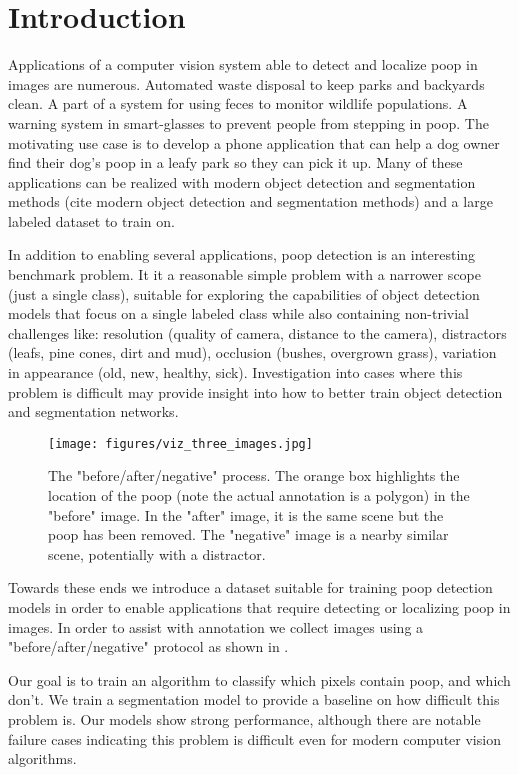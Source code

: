\documentclass[10pt,twocolumn,letterpaper]{article}
\begin{document}
\section{Introduction}
\label{sec:intro}

Applications of a computer vision system able to detect and localize poop in
images are numerous.
Automated waste disposal to keep parks and backyards clean.
A part of a system for using feces to monitor wildlife populations.
A warning system in smart-glasses to prevent people from stepping in poop.
The motivating use case is to develop a phone application that can help a dog
owner find their dog's poop in a leafy park so they can pick it up.
Many of these applications can be realized with modern object detection and
segmentation methods (cite modern object detection and segmentation methods)
and a large labeled dataset to train on.


In addition to enabling several applications, poop detection is an interesting benchmark problem. 
It it a reasonable simple problem with a narrower scope (just a single class),
suitable for exploring the capabilities of object detection models that focus
on a single labeled class while also containing non-trivial challenges like:
resolution (quality of camera, distance to the camera),
distractors (leafs, pine cones, dirt and mud),
occlusion (bushes, overgrown grass),
variation in appearance (old, new, healthy, sick).
Investigation into cases where this problem is difficult may provide insight
into how to better train object detection and segmentation networks.


\begin{figure}[h]
\centering
\texttt{[image: figures/viz\_three\_images.jpg]}
\caption[]{
    The "before/after/negative" process.
    The orange box highlights the location of the poop (note the
    actual annotation is a polygon) in the "before" image.
    In the "after" image, it is the same scene but the poop has been removed.
    The "negative" image is a nearby similar scene, potentially with a distractor.
}
\label{fig:ThreeImages}
\end{figure}

Towards these ends we introduce a dataset suitable for training poop detection
models in order to enable applications that require detecting or localizing
poop in images. In order to assist with annotation we collect images using a
"before/after/negative" protocol as shown in . 

Our goal is to train an algorithm to classify which pixels contain poop, and
which don't. We train a segmentation model to provide a baseline on how
difficult this problem is. Our models show strong performance, although there
are notable failure cases indicating this problem is difficult even for modern
computer vision algorithms.
\end{document}

